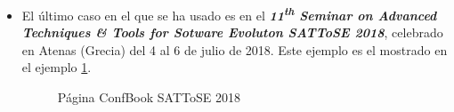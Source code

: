 \documentclass[a4paper, 12pt]{book}
\begin{document}
\begin{itemize}
\item El último caso en el que se ha usado es en el \textbf{\textit{11\textsuperscript{th} Seminar on Advanced Techniques \& Tools for Sotware Evoluton SATToSE 2018}}, celebrado en Atenas (Grecia) del 4 al 6 de julio de 2018. Este ejemplo es el mostrado en el ejemplo \ref{fig:imgSATToSE}.
\begin{figure}[h!]
	\centering
	\caption{Página ConfBook SATToSE 2018}
	\label{fig:imgSATToSE}
\end{figure}
\end{itemize}


\end{document}
